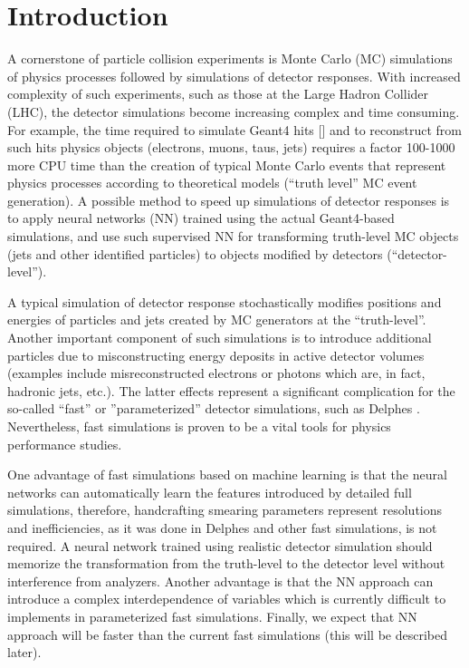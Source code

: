 \documentclass[showpacs,showkeys,preprint,prd,nofootinbib,linenumbers,12pt]{revtex4-1}
\begin{document}
\section{Introduction}

A cornerstone of particle collision experiments is Monte Carlo (MC) simulations of physics processes followed  by simulations of detector responses. With increased complexity of such experiments, such as those at the Large Hadron Collider (LHC), the detector simulations become increasing complex and time consuming.  For example, the time required to simulate Geant4 hits [] and to reconstruct from such hits physics objects (electrons, muons, taus, jets) requires a factor 100-1000  more CPU time than the creation of typical Monte Carlo events that represent physics processes according to theoretical models (``truth level'' MC event generation).  A possible method to speed up simulations of detector responses is to apply neural networks (NN) trained using the actual Geant4-based simulations, and use such supervised NN for transforming truth-level MC objects (jets and other identified particles) to objects modified by detectors (``detector-level'').  

A typical simulation of detector response stochastically modifies positions and energies of particles and jets created by MC generators at the ``truth-level''. Another important component of such simulations is to introduce additional particles due to misconstructing energy deposits in active detector volumes  (examples include misreconstructed electrons or photons which are, in fact, hadronic jets, etc.). The latter effects  represent a significant complication for the so-called ``fast'' or ''parameterized'' detector simulations, such as Delphes \cite{deFavereau:2013fsa}.
Nevertheless, fast simulations is proven to be a vital tools for physics performance studies.

One advantage of fast simulations based on machine learning is that the neural networks can automatically learn the features introduced by detailed full simulations, therefore, handcrafting smearing parameters represent resolutions and inefficiencies, as it was done in Delphes and other fast simulations, is not required. A neural network trained using realistic detector simulation should memorize the transformation from the truth-level to the detector level without interference from analyzers. Another advantage is that the NN approach can introduce a complex interdependence of variables which is currently difficult to implements in parameterized fast simulations. Finally, we expect that NN approach will be faster than the current fast simulations (this will be described later).
\end{document}

